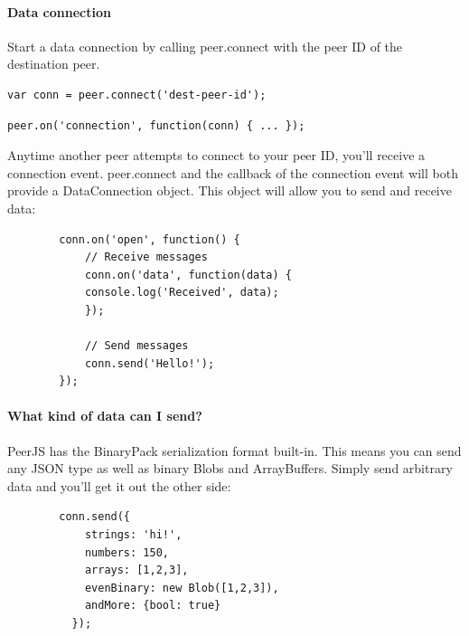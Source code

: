 \documentclass{article}
\begin{document}
    \paragraph{Data connection}
    Start a data connection by calling peer.connect with the peer ID of the destination peer.

    \begin{lstlisting}[caption = Start connection ]
        var conn = peer.connect('dest-peer-id');
    \end{lstlisting}

    \begin{lstlisting}[caption = Receive connection ]
        peer.on('connection', function(conn) { ... });
    \end{lstlisting}

    Anytime another peer attempts to connect to your peer ID, you'll receive a connection event.
    peer.connect and the callback of the connection event will both provide a DataConnection object. This object will allow you to send and receive data:

    \begin{lstlisting}
        conn.on('open', function() {
            // Receive messages
            conn.on('data', function(data) {
            console.log('Received', data);
            });
        
            // Send messages
            conn.send('Hello!');
        });
    \end{lstlisting}

    \paragraph{What kind of data can I send?}
    PeerJS has the BinaryPack serialization format built-in. This means you can send any JSON type as well as binary Blobs and ArrayBuffers. Simply send arbitrary data and you'll get it out the other side:

    \begin{lstlisting}
        conn.send({
            strings: 'hi!',
            numbers: 150,
            arrays: [1,2,3],
            evenBinary: new Blob([1,2,3]),
            andMore: {bool: true}
          });
    \end{lstlisting}
\end{document}
